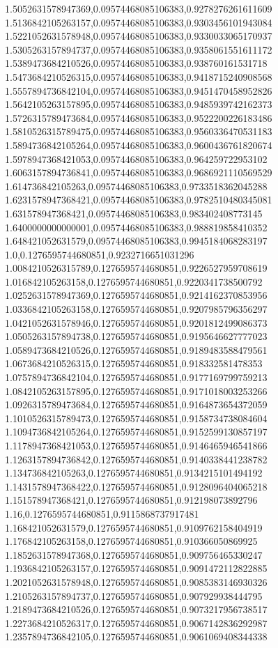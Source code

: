 1.5052631578947369,0.09574468085106383,0.9278276261611609
1.5136842105263157,0.09574468085106383,0.9303456101943084
1.5221052631578948,0.09574468085106383,0.9330033065170937
1.5305263157894737,0.09574468085106383,0.9358061551611172
1.5389473684210526,0.09574468085106383,0.938760161531718
1.5473684210526315,0.09574468085106383,0.9418715240908568
1.5557894736842104,0.09574468085106383,0.9451470458952826
1.5642105263157895,0.09574468085106383,0.9485939742162373
1.5726315789473684,0.09574468085106383,0.9522200226183486
1.5810526315789475,0.09574468085106383,0.9560336470531183
1.5894736842105264,0.09574468085106383,0.9600436761820674
1.5978947368421053,0.09574468085106383,0.964259722953102
1.6063157894736841,0.09574468085106383,0.9686921110569529
1.614736842105263,0.09574468085106383,0.9733518362045288
1.6231578947368421,0.09574468085106383,0.9782510480345081
1.631578947368421,0.09574468085106383,0.983402408773145
1.6400000000000001,0.09574468085106383,0.988819858410352
1.648421052631579,0.09574468085106383,0.9945184068283197
1.0,0.1276595744680851,0.9232716651031296
1.0084210526315789,0.1276595744680851,0.9226527959708619
1.016842105263158,0.1276595744680851,0.9220341738500792
1.0252631578947369,0.1276595744680851,0.9214162370853956
1.0336842105263158,0.1276595744680851,0.9207985796356297
1.0421052631578946,0.1276595744680851,0.9201812499086373
1.0505263157894738,0.1276595744680851,0.9195646627777023
1.0589473684210526,0.1276595744680851,0.9189483588479561
1.0673684210526315,0.1276595744680851,0.918332581478353
1.0757894736842104,0.1276595744680851,0.9177169799759213
1.0842105263157895,0.1276595744680851,0.9171018003253266
1.0926315789473684,0.1276595744680851,0.9164873654372059
1.1010526315789473,0.1276595744680851,0.9158734738084604
1.1094736842105264,0.1276595744680851,0.9152599130857197
1.1178947368421053,0.1276595744680851,0.9146465946541866
1.1263157894736842,0.1276595744680851,0.9140338441238782
1.134736842105263,0.1276595744680851,0.9134215101494192
1.1431578947368422,0.1276595744680851,0.9128096404065218
1.151578947368421,0.1276595744680851,0.912198073892796
1.16,0.1276595744680851,0.9115868737917481
1.168421052631579,0.1276595744680851,0.9109762158404919
1.176842105263158,0.1276595744680851,0.910366050869925
1.1852631578947368,0.1276595744680851,0.909756465330247
1.1936842105263157,0.1276595744680851,0.9091472112822885
1.2021052631578948,0.1276595744680851,0.9085383146930326
1.2105263157894737,0.1276595744680851,0.907929938444795
1.2189473684210526,0.1276595744680851,0.9073217956738517
1.2273684210526317,0.1276595744680851,0.9067142836292987
1.2357894736842105,0.1276595744680851,0.9061069408344338
